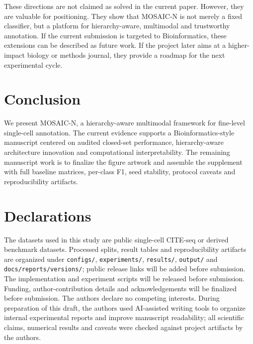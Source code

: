 \documentclass[unnumsec,webpdf,contemporary,large,numbered]{oup-authoring-template}
\begin{document}
These directions are not claimed as solved in the current paper. However, they are valuable for positioning. They show that MOSAIC-N is not merely a fixed classifier, but a platform for hierarchy-aware, multimodal and trustworthy annotation. If the current submission is targeted to Bioinformatics, these extensions can be described as future work. If the project later aims at a higher-impact biology or methods journal, they provide a roadmap for the next experimental cycle.

\section{Conclusion}

We present MOSAIC-N, a hierarchy-aware multimodal framework for fine-level single-cell annotation. The current evidence supports a Bioinformatics-style manuscript centered on audited closed-set performance, hierarchy-aware architecture innovation and computational interpretability. The remaining manuscript work is to finalize the figure artwork and assemble the supplement with full baseline matrices, per-class F1, seed stability, protocol caveats and reproducibility artifacts.

\section{Declarations}

The datasets used in this study are public single-cell CITE-seq or derived benchmark datasets. Processed splits, result tables and reproducibility artifacts are organized under \texttt{configs/}, \texttt{experiments/}, \texttt{results/}, \texttt{output/} and \texttt{docs/reports/versions/}; public release links will be added before submission. The implementation and experiment scripts will be released before submission. Funding, author-contribution details and acknowledgements will be finalized before submission. The authors declare no competing interests. During preparation of this draft, the authors used AI-assisted writing tools to organize internal experimental reports and improve manuscript readability; all scientific claims, numerical results and caveats were checked against project artifacts by the authors.



\end{document}
